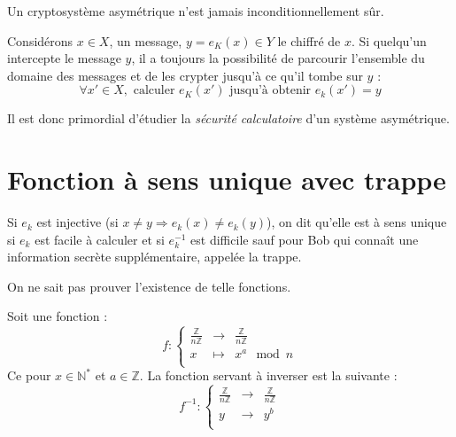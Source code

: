 \documentclass[a4paper, 10pt]{thesis}
\begin{document}
\begin{rq}
    Un cryptosystème asymétrique n'est jamais inconditionnellement sûr.
\end{rq}

Considérons $x \in X$, un message, $y = e_K(x) \in Y$ le chiffré de $x$. Si quelqu'un intercepte le
message $y$, il a toujours la possibilité de parcourir l'ensemble du domaine des messages et de les
crypter jusqu'à ce qu'il tombe sur $y$ : 
\begin{displaymath}
    \forall x' \in X, \mbox{ calculer }e_K(x')\mbox{ jusqu'à obtenir } e_k(x') = y
\end{displaymath}

Il est donc primordial d'étudier la \emph{sécurité calculatoire} d'un système asymétrique.

\section{Fonction à sens unique avec trappe}

\begin{df}
    Si $e_k$ est injective (si $x \neq y \Rightarrow e_k(x) \neq e_k(y)$), on dit qu'elle est à sens
    unique si $e_k$ est facile à calculer et si $e_k^{-1}$ est difficile sauf pour Bob qui connaît
    une information secrète supplémentaire, appelée la trappe.
\end{df}

\begin{rq}
    On ne sait pas prouver l'existence de telle fonctions.
\end{rq}

\begin{ex}
    Soit une fonction : 
    \begin{displaymath}
        f : \left \{ 
        \begin{array}{rcl}
            \frac{\mathbb{Z}}{n\mathbb{Z}} & \longrightarrow & \frac{\mathbb{Z}}{n\mathbb{Z}} \\
            x & \longmapsto & x^a \mod n \\
        \end{array} \right .
    \end{displaymath}
    Ce pour $x \in \mathbb{N}^*$ et $a \in \mathbb{Z}$.
    La fonction servant à inverser est la suivante :
    \begin{displaymath}
        f^{-1} : \left \{ 
        \begin{array}{rcl}
            \frac{\mathbb{Z}}{n\mathbb{Z}} & \longrightarrow & \frac{\mathbb{Z}}{n\mathbb{Z}} \\
            y & \longrightarrow & y^b \\
        \end{array}
        \right .
    \end{displaymath}
\end{ex}
\end{document}
